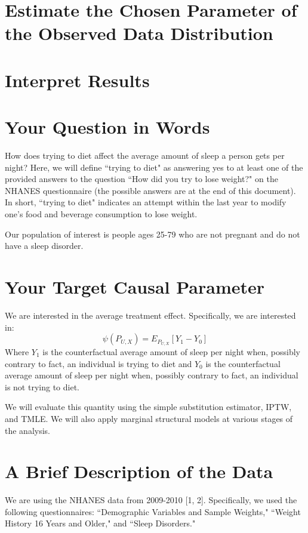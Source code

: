 \documentclass{article}
\begin{document}
\section{Estimate the Chosen Parameter of the Observed Data Distribution}

\section{Interpret Results}




\section{Your Question in Words}

How does trying to diet affect the average amount of sleep a person gets per night?  Here, we will define ``trying to diet" as answering yes to at least one of the provided answers to the question  ``How did you try to lose weight?" on the NHANES questionnaire (the possible answers are at the end of this document).  In short, ``trying to diet" indicates an attempt within the last year to modify one's food and beverage consumption to lose weight.

Our population of interest is people ages 25-79 who are not pregnant and do not have a sleep disorder. 

\section{Your Target Causal Parameter}

We are interested in the average treatment effect. Specifically, we are interested in:
$$\psi(P_{U,X}) = E_{P_{U,X}}[Y_1-Y_0]$$
Where $Y_1$ is the counterfactual average amount of sleep per night when, possibly contrary to fact, an individual is trying to diet and $Y_0$ is the counterfactual average amount of sleep per night when, possibly contrary to fact, an individual is not trying to diet.

We will evaluate this quantity using the simple substitution estimator, IPTW, and TMLE. We will also apply marginal structural models at various stages of the analysis.

\section{A Brief Description of the Data}

We are using the NHANES data from 2009-2010 [1, 2].  Specifically, we used the following questionnaires: ``Demographic Variables and Sample Weights," ``Weight History 16 Years and Older," and ``Sleep Disorders."
\end{document}
